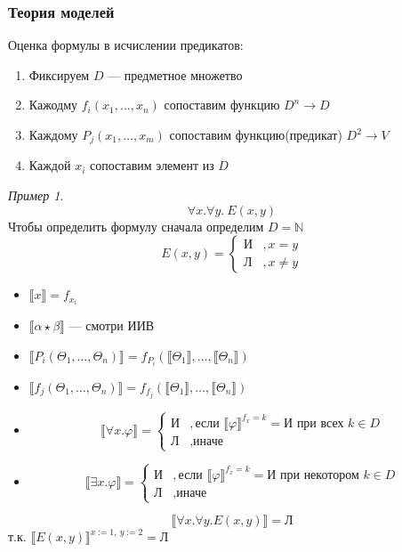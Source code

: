 \documentclass[english]{article}
\newcommand{\N}{\mathbb{N}}
\theoremstyle{plain}
\theoremstyle{remark}
\newtheorem*{examp}{Пример}
\theoremstyle{definition}
\begin{document}
\subsubsection{Теория моделей}
\label{sec:orga015200}
Оценка формулы в исчислении предикатов:
\begin{enumerate}
\item Фиксируем \(D\) --- предметное множетво
\item Кажодму \(f_i(x_1, \dots, x_n)\) сопоставим функцию \(D^n \to D\)
\item Каждому \(P_j(x_1, \dots, x_m)\) сопоставим функцию(предикат) \(D^2 \to V\)
\item Каждой \(x_i\) сопоставим элемент из \(D\)
\end{enumerate}
\begin{examp}
\[\forall x.\forall y.\ E(x, y)\]
Чтобы определить формулу сначала определим \(D = \N\) 
\[ E(x, y) = \begin{cases}\text{И} & ,x = y \\ \text{Л} &, x\neq y\end{cases} \]
\begin{itemize}
\item \(\llbracket x \rrbracket = f_{x_i}\)
\item \(\llbracket \alpha \star \beta \rrbracket\) --- смотри ИИВ
\item \(\llbracket P_i(\Theta_1, \dots , \Theta_n) \rrbracket = f_{P_i}(\llbracket \Theta_1 \rrbracket, \dots, \llbracket \Theta_n \rrbracket)\)
\item \(\llbracket f_j(\Theta_1 , \dots, \Theta_n ) \rrbracket = f_{f_j}(\llbracket \Theta_1 \rrbracket, \dots, \llbracket \Theta_n \rrbracket)\)
\item \[ \llbracket \forall x. \varphi \rrbracket = \begin{cases} \text{И} & , \text{если } \llbracket \varphi \rrbracket^{f_x = k} = \text{И}\text{ при всех } k \in D  \\ \text{Л} &,\text{иначе}\end{cases} \]
\item \[ \llbracket \exists x.\varphi \rrbracket = \begin{cases} \text{И} &, \text{если } \llbracket \varphi \rrbracket^{f_x = k} = \text{И при некотором } k \in D \\ \text{Л} &,\text{иначе} \end{cases} \]
\end{itemize}
\[ \llbracket \forall x.\forall y.E(x, y) \rrbracket = \text{Л} \]
т.к. \(\llbracket E(x, y) \rrbracket^{x:=1,\ y:=2} = \text{Л}\)
\end{examp}
\newcommand{\colorboxed}[2]{\,\color{#1}\fbox{\color{black}#2}\color{black}\,}
\end{document}
